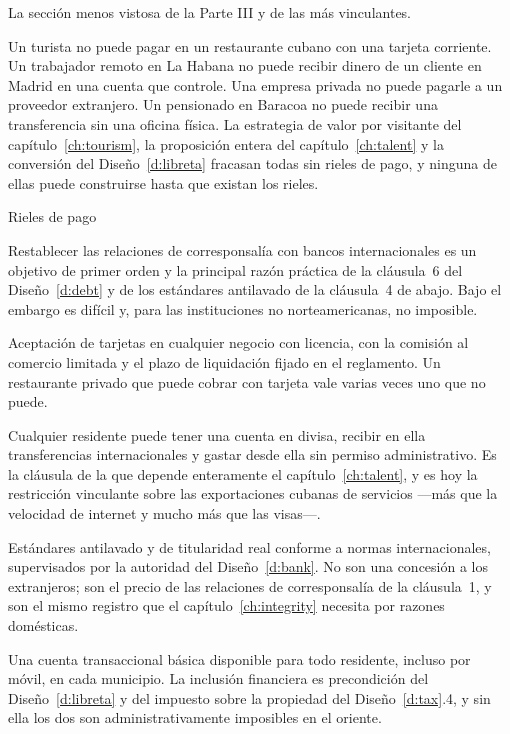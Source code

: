La sección menos vistosa de la Parte III y de las más vinculantes.

Un turista no puede pagar en un restaurante cubano con una tarjeta corriente. Un
trabajador remoto en La Habana no puede recibir dinero de un cliente en Madrid en una
cuenta que controle. Una empresa privada no puede pagarle a un proveedor extranjero. Un
pensionado en Baracoa no puede recibir una transferencia sin una oficina física. La
estrategia de valor por visitante del capítulo~\ref{ch:tourism}, la proposición entera
del capítulo~\ref{ch:talent} y la conversión del Diseño~\ref{d:libreta} fracasan todas
sin rieles de pago, y ninguna de ellas puede construirse hasta que existan los rieles.

\begin{design}{Rieles de pago}
\label{d:pay2}
\begin{rules}
 Restablecer las relaciones de corresponsalía con bancos
internacionales es un objetivo de primer orden y la principal razón práctica de la
cláusula~6 del Diseño~\ref{d:debt} y de los estándares antilavado de la cláusula~4 de
abajo. Bajo el embargo es difícil y, para las instituciones no norteamericanas, no
imposible.

 Aceptación de tarjetas en cualquier negocio con licencia,
con la comisión al comercio limitada y el plazo de liquidación fijado en el reglamento.
Un restaurante privado que puede cobrar con tarjeta vale varias veces uno que no puede.

 Cualquier residente puede tener una cuenta en
divisa, recibir en ella transferencias internacionales y gastar desde ella sin permiso
administrativo. Es la cláusula de la que depende enteramente el
capítulo~\ref{ch:talent}, y es hoy la restricción vinculante sobre las exportaciones
cubanas de servicios ---más que la velocidad de internet y mucho más que las visas---.

 Estándares antilavado y de titularidad real conforme a normas
internacionales, supervisados por la autoridad del Diseño~\ref{d:bank}. No son una
concesión a los extranjeros; son el precio de las relaciones de corresponsalía de la
cláusula~1, y son el mismo registro que el capítulo~\ref{ch:integrity} necesita por
razones domésticas.

 Una cuenta transaccional básica disponible para todo residente, incluso
por móvil, en cada municipio. La inclusión financiera es precondición del
Diseño~\ref{d:libreta} y del impuesto sobre la propiedad del Diseño~\ref{d:tax}.4, y sin
ella los dos son administrativamente imposibles en el oriente.
\end{rules}
\end{design}

